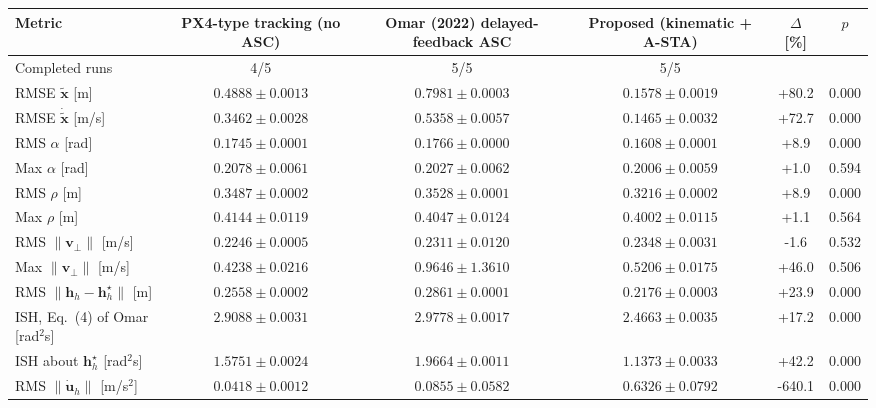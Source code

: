 
\begin{tabular}{lccccc}
\toprule
Metric & PX4-type tracking (no ASC) & Omar (2022) delayed-feedback ASC & Proposed (kinematic + A-STA) & $\Delta$ [\%] & $p$ \\
\midrule
Completed runs & 4/5 & 5/5 & 5/5 & & \\
RMSE $\tilde{\mathbf{x}}$ [m] & $0.4888 \pm 0.0013$ & $0.7981 \pm 0.0003$ & $0.1578 \pm 0.0019$ & +80.2 & 0.000 \\
RMSE $\dot{\tilde{\mathbf{x}}}$ [m/s] & $0.3462 \pm 0.0028$ & $0.5358 \pm 0.0057$ & $0.1465 \pm 0.0032$ & +72.7 & 0.000 \\
RMS $\alpha$ [rad] & $0.1745 \pm 0.0001$ & $0.1766 \pm 0.0000$ & $0.1608 \pm 0.0001$ & +8.9 & 0.000 \\
Max $\alpha$ [rad] & $0.2078 \pm 0.0061$ & $0.2027 \pm 0.0062$ & $0.2006 \pm 0.0059$ & +1.0 & 0.594 \\
RMS $\rho$ [m] & $0.3487 \pm 0.0002$ & $0.3528 \pm 0.0001$ & $0.3216 \pm 0.0002$ & +8.9 & 0.000 \\
Max $\rho$ [m] & $0.4144 \pm 0.0119$ & $0.4047 \pm 0.0124$ & $0.4002 \pm 0.0115$ & +1.1 & 0.564 \\
RMS $\|\mathbf{v}_\perp\|$ [m/s] & $0.2246 \pm 0.0005$ & $0.2311 \pm 0.0120$ & $0.2348 \pm 0.0031$ & -1.6 & 0.532 \\
Max $\|\mathbf{v}_\perp\|$ [m/s] & $0.4238 \pm 0.0216$ & $0.9646 \pm 1.3610$ & $0.5206 \pm 0.0175$ & +46.0 & 0.506 \\
RMS $\|\mathbf{h}_h-\mathbf{h}^\star_h\|$ [m] & $0.2558 \pm 0.0002$ & $0.2861 \pm 0.0001$ & $0.2176 \pm 0.0003$ & +23.9 & 0.000 \\
ISH, Eq.~(4) of Omar [rad$^2$s] & $2.9088 \pm 0.0031$ & $2.9778 \pm 0.0017$ & $2.4663 \pm 0.0035$ & +17.2 & 0.000 \\
ISH about $\mathbf{h}^\star_h$ [rad$^2$s] & $1.5751 \pm 0.0024$ & $1.9664 \pm 0.0011$ & $1.1373 \pm 0.0033$ & +42.2 & 0.000 \\
RMS $\|\dot{\mathbf{u}}_h\|$ [m/s$^2$] & $0.0418 \pm 0.0012$ & $0.0855 \pm 0.0582$ & $0.6326 \pm 0.0792$ & -640.1 & 0.000 \\
\bottomrule
\end{tabular}

